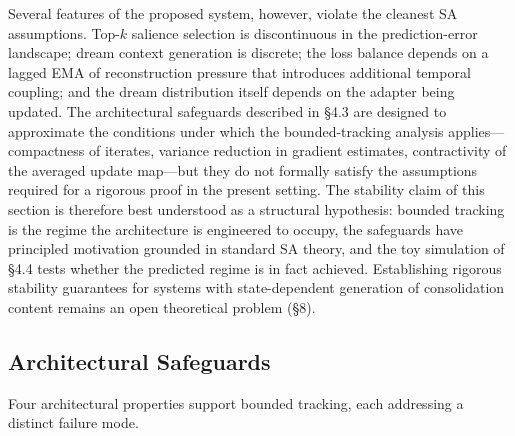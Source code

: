 \documentclass[11pt]{article}
\begin{document}
Several features of the proposed system, however, violate the cleanest SA assumptions. Top-$k$ salience selection is discontinuous in the prediction-error landscape; dream context generation is discrete; the loss balance depends on a lagged EMA of reconstruction pressure that introduces additional temporal coupling; and the dream distribution itself depends on the adapter being updated. The architectural safeguards described in \S 4.3 are designed to approximate the conditions under which the bounded-tracking analysis applies---compactness of iterates, variance reduction in gradient estimates, contractivity of the averaged update map---but they do not formally satisfy the assumptions required for a rigorous proof in the present setting. The stability claim of this section is therefore best understood as a structural hypothesis: bounded tracking is the regime the architecture is engineered to occupy, the safeguards have principled motivation grounded in standard SA theory, and the toy simulation of \S 4.4 tests whether the predicted regime is in fact achieved. Establishing rigorous stability guarantees for systems with state-dependent generation of consolidation content remains an open theoretical problem (\S 8).

\subsection{Architectural Safeguards}

Four architectural properties support bounded tracking, each addressing a distinct failure mode.
\end{document}
